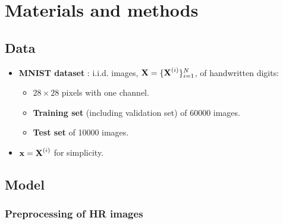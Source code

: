 \section{Materials and methods}
\label{sec:method}

\subsection{Data}
\label{sub:data}
\begin{itemize}
	\item \textbf{MNIST dataset} \cite{MNIST}: i.i.d. images, $\bm{\mathrm{X}} = \{\bm{\mathrm{X}}^{(i)}\}^N_{i=1}$, of handwritten digits:
	\begin{itemize}
		\item $28 \times 28$ pixels with one channel.
		\item \textbf{Training set} (including validation set) of 60000 images.
		\item \textbf{Test set} of 10000 images.
	\end{itemize}
	\item $\bm{\mathrm{x}} = \bm{\mathrm{X}}^{(i)}$ for simplicity.
\end{itemize}

\subsection{Model} %
\label{sub:the_model}

\begin{columnfigure}
	\centering
	
	\label{fig:diagram}
\end{columnfigure}

%

\subsubsection{Preprocessing of HR images}
\label{ssub:downsampling}

